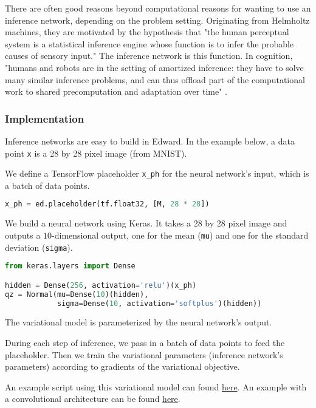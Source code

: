 There are often good reasons beyond computational reasons
for wanting to use an inference network, depending on the problem
setting.
Originating from
Helmholtz machines, they are motivated by the hypothesis
that "the human perceptual system is a statistical inference engine
whose function is to infer the probable causes of sensory input." The
inference network is this function.
In cognition, "humans and robots are in the setting of amortized
inference: they have to solve many similar inference problems, and can
thus offload part of the computational work to shared precomputation
and adaptation over time" \citep{stuhlmuller2013learning}.

\subsubsection{Implementation}

Inference networks are easy to build in Edward.
In the example below, a data point \texttt{x} is a 28 by 28 pixel
image (from MNIST).

We define a TensorFlow placeholder \texttt{x_ph} for the neural
network's input, which is a batch of data points.
\begin{lstlisting}[language=Python]
x_ph = ed.placeholder(tf.float32, [M, 28 * 28])
\end{lstlisting}

We build a neural network using Keras.
It takes a 28 by 28 pixel image and outputs a $10$-dimensional
output, one for the mean (\texttt{mu}) and one for the standard
deviation (\texttt{sigma}).
\begin{lstlisting}[language=Python]
from keras.layers import Dense

hidden = Dense(256, activation='relu')(x_ph)
qz = Normal(mu=Dense(10)(hidden),
            sigma=Dense(10, activation='softplus')(hidden))
\end{lstlisting}
The variational model is parameterized by the neural network's
output.

During each step of inference, we pass in a batch of data points to feed the
placeholder. Then we train the variational parameters (inference
network's parameters) according to
gradients of the variational objective.

An example script using this variational model can found
\href{https://github.com/blei-lab/edward/blob/master/examples/vae.py}
{here}.
An example with a convolutional architecture can be found
\href{https://github.com/blei-lab/edward/blob/master/examples/vae_convolutional_prettytensor.py}
{here}.

